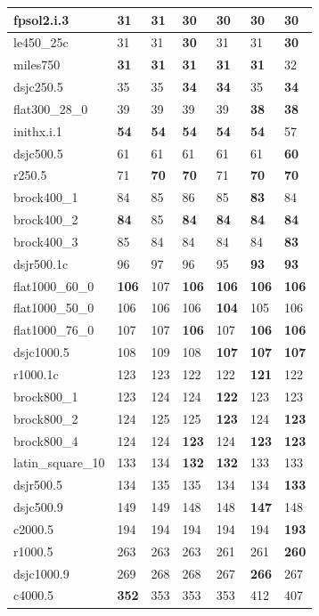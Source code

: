 \documentclass[12pt,a4paper,twoside]{scrartcl}
\numberwithin{equation}{section}
\begin{document}
\begin{table}[h!]
\begin{tabular}{|p{3cm}| p{1cm} p{1cm} p{1cm} p{1cm} p{1cm} p{1cm}|}
fpsol2.i.3&31&31&\textbf{30}&\textbf{30}&\textbf{30}&\textbf{30}\\ \hline
le450\_25c&31&31&\textbf{30}&31&31&\textbf{30}\\
miles750&\textbf{31}&\textbf{31}&\textbf{31}&\textbf{31}&\textbf{31}&32\\ 
dsjc250.5&35&35&\textbf{34}&\textbf{34}&35&\textbf{34}\\ 
flat300\_28\_0&39&39&39&39&\textbf{38}&\textbf{38}\\ 
inithx.i.1&\textbf{54}&\textbf{54}&\textbf{54}&\textbf{54}&\textbf{54}&57\\ \hline
dsjc500.5&61&61&61&61&61&\textbf{60}\\
r250.5&71&\textbf{70}&\textbf{70}&71&\textbf{70}&\textbf{70}\\
brock400\_1&84&85&86&85&\textbf{83}&84\\ 
brock400\_2&\textbf{84}&85&\textbf{84}&\textbf{84}&\textbf{84}&\textbf{84}\\ 
brock400\_3&85&84&84&84&84&\textbf{83}\\ \hline
dsjr500.1c&96&97&96&95&\textbf{93}&\textbf{93}\\
flat1000\_60\_0&\textbf{106}&107&\textbf{106}&\textbf{106}&\textbf{106}&\textbf{106}\\ 
flat1000\_50\_0&106&106&106&\textbf{104}&105&106\\ 
flat1000\_76\_0&107&107&\textbf{106}&107&\textbf{106}&\textbf{106}\\ 
dsjc1000.5&108&109&108&\textbf{107}&\textbf{107}&\textbf{107}\\ \hline
r1000.1c&123&123&122&122&\textbf{121}&122\\
brock800\_1&123&124&124&\textbf{122}&123&123\\ 
brock800\_2&124&125&125&\textbf{123}&124&\textbf{123}\\ 
brock800\_4&124&124&\textbf{123}&124&\textbf{123}&\textbf{123}\\
latin\_square\_10&133&134&\textbf{132}&\textbf{132}&133&133\\ \hline
dsjr500.5&134&135&135&134&134&\textbf{133}\\
dsjc500.9&149&149&148&148&\textbf{147}&148\\ 
c2000.5&194&194&194&194&194&\textbf{193}\\
r1000.5&263&263&263&261&261&\textbf{260}\\ 
dsjc1000.9&269&268&268&267&\textbf{266}&267\\
c4000.5&\textbf{352}&353&353&353&412&407\\ \hline
\end{tabular}
\end{table}
\end{document}
